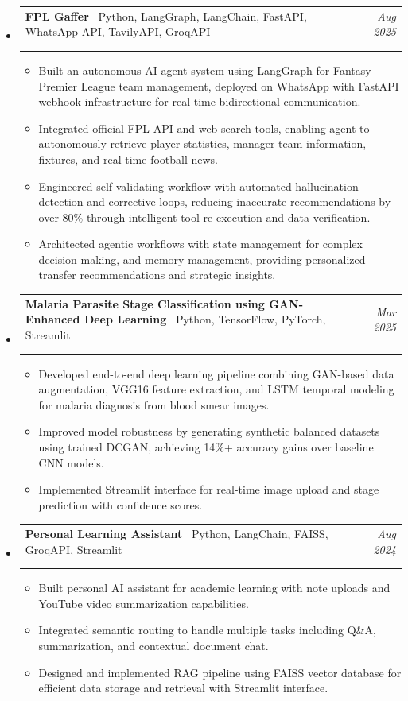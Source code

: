 \documentclass[11pt,a4paper]{article}
\makeatletter
\newcommand{\resumeProjectHeading}[4]{
  \vspace{2pt}
  \item[]
    \begin{tabular*}{\textwidth}[t]{@{\hspace{0pt}}p{0.82\textwidth}@{\extracolsep{\fill}}r}
      \textbf{#1} {\small\textbar\ #2} & \textit{#3} \\
      \if\relax\detokenize{#4}\relax\else
        \multicolumn{2}{l}{\footnotesize\color{gray!70}\faGithub\ \href{#4}{#4}} \\
      \fi
    \end{tabular*}
  \vspace{-8pt}
}
\makeatother
\begin{document}
\begin{itemize}[leftmargin=0pt, label={}]

\resumeProjectHeading
  {FPL Gaffer}{Python, LangGraph, LangChain, FastAPI, WhatsApp API, TavilyAPI, GroqAPI}{Aug 2025}{https://github.com/DejusDevspace/fpl-gaffer}
  \begin{itemize}[leftmargin=15pt, label=\textbullet]
    \item Built an autonomous AI agent system using LangGraph for Fantasy Premier League team management, deployed on WhatsApp with FastAPI webhook infrastructure for real-time bidirectional communication.
    \item Integrated official FPL API and web search tools, enabling agent to autonomously retrieve player statistics, manager team information, fixtures, and real-time football news.
    \item Engineered self-validating workflow with automated hallucination detection and corrective loops, reducing inaccurate recommendations by over 80\% through intelligent tool re-execution and data verification.
    \item Architected agentic workflows with state management for complex decision-making, and memory management, providing personalized transfer recommendations and strategic insights.
  \end{itemize}

\resumeProjectHeading
  {Malaria Parasite Stage Classification using GAN-Enhanced Deep Learning}{Python, TensorFlow, PyTorch, Streamlit}{Mar 2025}{}
  \begin{itemize}[leftmargin=15pt, label=\textbullet]
    \item Developed end-to-end deep learning pipeline combining GAN-based data augmentation, VGG16 feature extraction, and LSTM temporal modeling for malaria diagnosis from blood smear images.
    \item Improved model robustness by generating synthetic balanced datasets using trained DCGAN, achieving 14\%+ accuracy gains over baseline CNN models.
    \item Implemented Streamlit interface for real-time image upload and stage prediction with confidence scores.
  \end{itemize}

\resumeProjectHeading
  {Personal Learning Assistant}{Python, LangChain, FAISS, GroqAPI, Streamlit}{Aug 2024}{https://github.com/DejusDevspace/Personal-Leaning-Assistant-Q-A-Conversational-Chatbot}
  \begin{itemize}[leftmargin=15pt, label=\textbullet]
    \item Built personal AI assistant for academic learning with note uploads and YouTube video summarization capabilities.
    \item Integrated semantic routing to handle multiple tasks including Q\&A, summarization, and contextual document chat.
    \item Designed and implemented RAG pipeline using FAISS vector database for efficient data storage and retrieval with Streamlit interface.
  \end{itemize}


\end{itemize}
\end{document}
